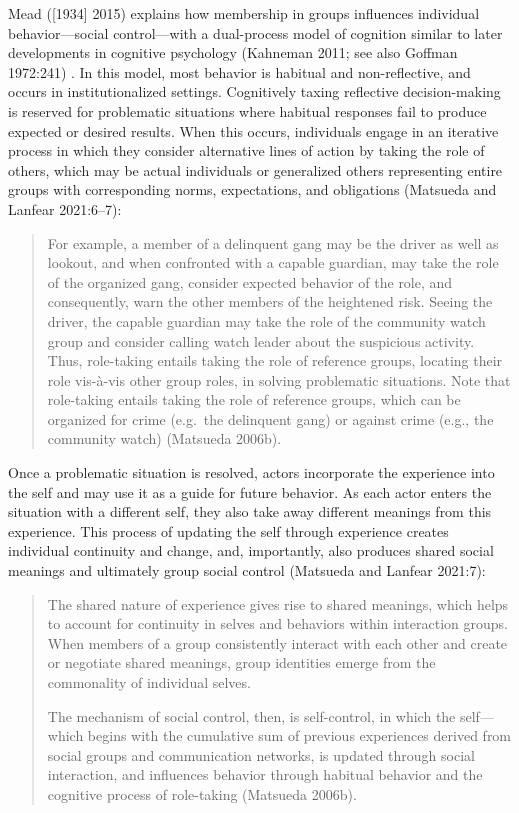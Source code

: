 \documentclass [11pt, proquest] {uwthesis}[2015/03/03]
\begin{document}
Mead ({[}1934{]} 2015) explains how membership in groups influences individual behavior---social control---with a dual-process model of cognition similar to later developments in cognitive psychology (Kahneman 2011; see also Goffman 1972:241) . In this model, most behavior is habitual and non-reflective, and occurs in institutionalized settings. Cognitively taxing reflective decision-making is reserved for problematic situations where habitual responses fail to produce expected or desired results. When this occurs, individuals engage in an iterative process in which they consider alternative lines of action by taking the role of others, which may be actual individuals or generalized others representing entire groups with corresponding norms, expectations, and obligations (Matsueda and Lanfear 2021:6--7):
\begin{quote}
For example, a member of a delinquent gang may be the driver as well as lookout, and when confronted with a capable guardian, may take the role of the organized gang, consider expected behavior of the role, and consequently, warn the other members of the heightened risk. Seeing the driver, the capable guardian may take the role of the community watch group and consider calling watch leader about the suspicious activity. Thus, role-taking entails taking the role of reference groups, locating their role vis-à-vis other group roles, in solving problematic situations. Note that role-taking entails taking the role of reference groups, which can be organized for crime (e.g.~the delinquent gang) or against crime (e.g., the community watch) (Matsueda 2006b).
\end{quote}
Once a problematic situation is resolved, actors incorporate the experience into the self and may use it as a guide for future behavior. As each actor enters the situation with a different self, they also take away different meanings from this experience. This process of updating the self through experience creates individual continuity and change, and, importantly, also produces shared social meanings and ultimately group social control (Matsueda and Lanfear 2021:7):
\begin{quote}
The shared nature of experience gives rise to shared meanings, which helps to account for continuity in selves and behaviors within interaction groups. When members of a group consistently interact with each other and create or negotiate shared meanings, group identities emerge from the commonality of individual selves.

The mechanism of social control, then, is self-control, in which the self---which begins with the cumulative sum of previous experiences derived from social groups and communication networks, is updated through social interaction, and influences behavior through habitual behavior and the cognitive process of role-taking (Matsueda 2006b).
\end{quote}
\end{document}
